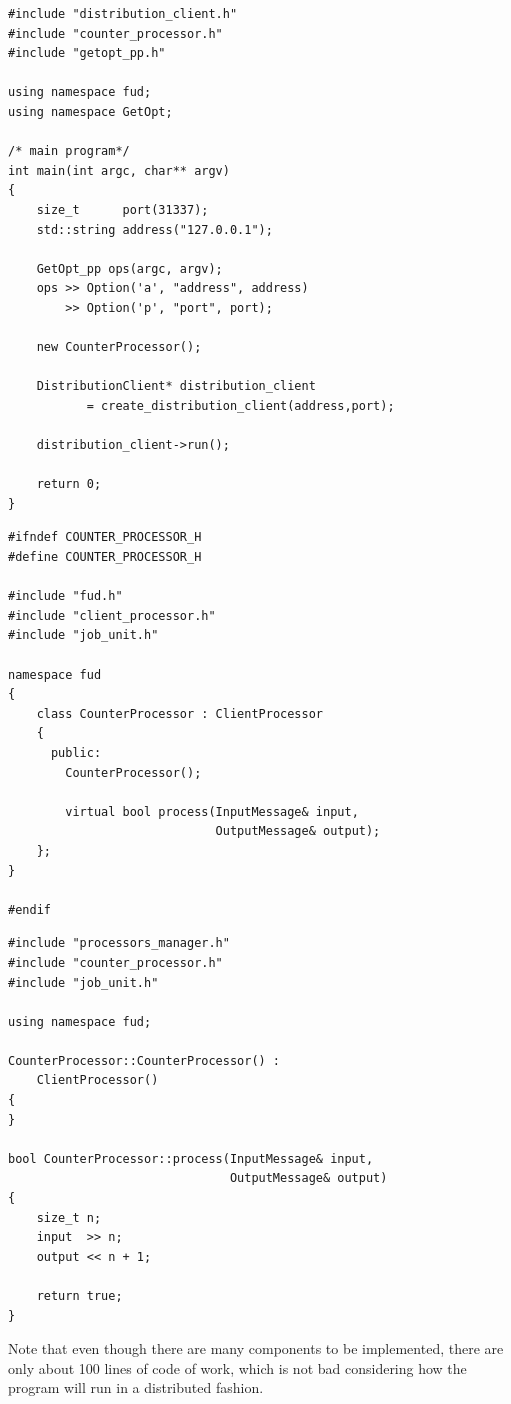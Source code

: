 \documentclass[a4paper,12pt,english]{article}
\newcommand{\CP}{\texttt{ClientProcessor}}
\begin{document}
\begin{table}[!htb]
\lstset{language=C++}
\begin{lstlisting}[frame=single]
#include "distribution_client.h"
#include "counter_processor.h"
#include "getopt_pp.h"

using namespace fud;
using namespace GetOpt;

/* main program*/
int main(int argc, char** argv)
{
    size_t      port(31337);
    std::string address("127.0.0.1");

    GetOpt_pp ops(argc, argv);
    ops >> Option('a', "address", address) 
        >> Option('p', "port", port);

    new CounterProcessor();

    DistributionClient* distribution_client 
           = create_distribution_client(address,port);

    distribution_client->run();

    return 0;
}
\end{lstlisting}
\centering \caption{Main program of the \texttt{Counter} client application.} \label{counterclient}
\end{table}

\begin{table}[!htb]
\lstset{language=C++}
\begin{lstlisting}[frame=single]
#ifndef COUNTER_PROCESSOR_H
#define COUNTER_PROCESSOR_H

#include "fud.h"
#include "client_processor.h"
#include "job_unit.h"

namespace fud
{
    class CounterProcessor : ClientProcessor
    {
      public:
        CounterProcessor();

        virtual bool process(InputMessage& input, 
                             OutputMessage& output);
    };
}

#endif
\end{lstlisting}
\centering \caption{Implementation of the \texttt{Counter} \CP.} \label{counterprochdr}
\end{table}


\begin{table}[!htb]
\lstset{language=C++}%
\begin{lstlisting}[frame=single]
#include "processors_manager.h"
#include "counter_processor.h"
#include "job_unit.h"

using namespace fud;

CounterProcessor::CounterProcessor() :
    ClientProcessor()
{
}

bool CounterProcessor::process(InputMessage& input, 
                               OutputMessage& output)
{
    size_t n;
    input  >> n;
    output << n + 1;

    return true;
}
\end{lstlisting}
\centering \caption{Implementation of the \texttt{Counter} \CP.} \label{counterprocessor}
\end{table}

Note that even though there are many components to be implemented, there are only about 100 lines of code of work, which is not bad considering how the program will run in a distributed fashion. 

\clearpage

\vfill



\end{document}
